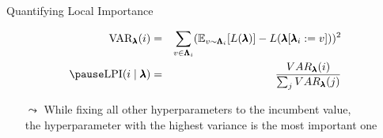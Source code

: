 \begin{frame}[c]{Quantifying Local Importance }

\begin{eqnarray}
\text{VAR}_{\conf} (i)  &=& \sum_{v \in \pcs_{i}} (\mathbb{E}_{v \sim \pcs_{i}}[\loss(\conf) ] - \loss(\conf[ \conf_{i} := v]))^2\\
\pause
\text{LPI}( i  \mid \conf ) &=& \frac{VAR_{\conf} (i) }{ \sum_{j}  VAR_{\conf} (j)}
\end{eqnarray}

\bigskip
\pause

\begin{itemize}
	\item[$\leadsto$] While fixing all other hyperparameters to the incumbent value,\\ the hyperparameter with the highest variance  is the most important one
\end{itemize}

\end{frame}

